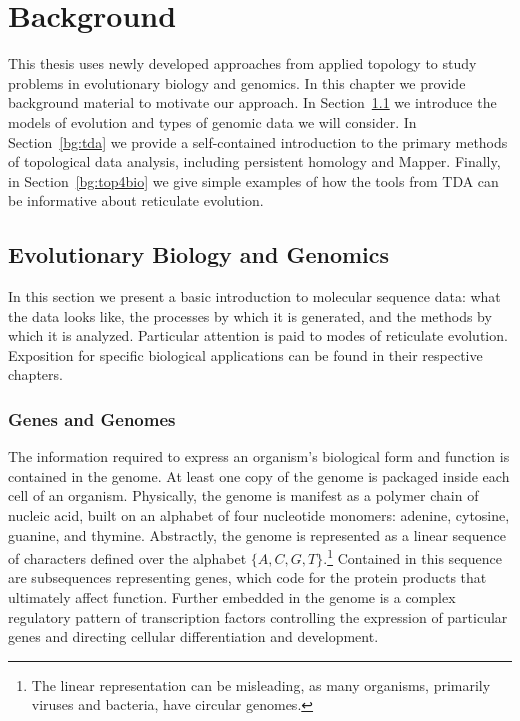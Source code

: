 \chapter{Background}
\label{ch:background}

This thesis uses newly developed approaches from applied topology to study problems in evolutionary biology and genomics.
In this chapter we provide background material to motivate our approach.
In Section~\ref{bg:bio} we introduce the models of evolution and types of genomic data we will consider.
In Section~\ref{bg:tda} we provide a self-contained introduction to the primary methods of topological data analysis, including persistent homology and Mapper.
Finally, in Section~\ref{bg:top4bio} we give simple examples of how the tools from TDA can be informative about reticulate evolution.

\section{Evolutionary Biology and Genomics}
\label{bg:bio}

In this section we present a basic introduction to molecular sequence data: what the data looks like, the processes by which it is generated, and the methods by which it is analyzed.
Particular attention is paid to modes of reticulate evolution.
Exposition for specific biological applications can be found in their respective chapters.

\subsection{Genes and Genomes}
\label{bg:bio:genes}

The information required to express an organism's biological form and function is contained in the genome.
At least one copy of the genome is packaged inside each cell of an organism.
Physically, the genome is manifest as a polymer chain of nucleic acid, built on an alphabet of four nucleotide monomers: adenine, cytosine, guanine, and thymine.
Abstractly, the genome is represented as a linear sequence of characters defined over the alphabet $\{A,C,G,T\}$.\footnote{The linear representation can be misleading, as many organisms, primarily viruses and bacteria, have circular genomes.}
Contained in this sequence are subsequences representing genes, which code for the protein products that ultimately affect function.
Further embedded in the genome is a complex regulatory pattern of transcription factors controlling the expression of particular genes and directing cellular differentiation and development.

